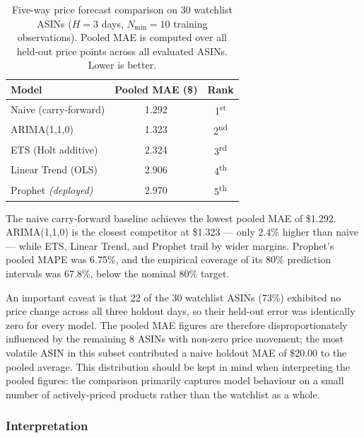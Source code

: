 \begin{table}[H]
  \centering
  \begin{tabular}{lcc}
    \toprule
    \textbf{Model} & \textbf{Pooled MAE (\$)} & \textbf{Rank} \\
    \midrule
    Naive (carry-forward)    & 1.292 & 1\textsuperscript{st} \\
    ARIMA(1,1,0)             & 1.323 & 2\textsuperscript{nd} \\
    ETS (Holt additive)      & 2.324 & 3\textsuperscript{rd} \\
    Linear Trend (OLS)       & 2.906 & 4\textsuperscript{th} \\
    Prophet \emph{(deployed)} & 2.970 & 5\textsuperscript{th} \\
    \bottomrule
  \end{tabular}
  \caption{Five-way price forecast comparison on 30 watchlist ASINs ($H = 3$ days, $N_{\min} = 10$ training observations). Pooled MAE is computed over all held-out price points across all evaluated ASINs. Lower is better.}
  \label{tab:forecast_comparison}
\end{table}

The naive carry-forward baseline achieves the lowest pooled MAE of \$1.292. ARIMA(1,1,0) is the closest competitor at \$1.323 --- only 2.4\% higher than naive --- while ETS, Linear Trend, and Prophet trail by wider margins. Prophet's pooled MAPE was 6.75\%, and the empirical coverage of its 80\% prediction intervals was 67.8\%, below the nominal 80\% target.

An important caveat is that 22 of the 30 watchlist ASINs (73\%) exhibited no price change across all three holdout days, so their held-out error was identically zero for every model. The pooled MAE figures are therefore disproportionately influenced by the remaining 8 ASINs with non-zero price movement; the most volatile ASIN in this subset contributed a naive holdout MAE of \$20.00 to the pooled average. This distribution should be kept in mind when interpreting the pooled figures: the comparison primarily captures model behaviour on a small number of actively-priced products rather than the watchlist as a whole.

\subsubsection*{Interpretation}

